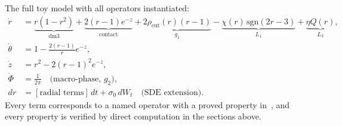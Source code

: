 \documentclass[12pt, oneside]{book}
\theoremstyle{plain}
\theoremstyle{definition}
\theoremstyle{remark}
\begin{document}
The full toy model with all operators instantiated:
\begin{align}
  \dot r &= \underbrace{r(1-r^2)}_{\text{dm3}}
           + \underbrace{2(r-1)e^{-z}}_{\text{contact}}
           + \underbrace{2\rho_{\mathrm{cut}}(r)(r-1)}_{g_1}
           - \underbrace{\chi(r)\,\mathrm{sgn}(2r-3)}_{L_1}
           + \underbrace{\eta Q(r)}_{L_3},\\
  \dot\theta &= 1 - \frac{2(r-1)}{r}e^{-z},\\
  \dot z &= r^2 - 2(r-1)^2 e^{-z},\\
  \dot\Phi &= \frac{1}{2\pi}\quad\text{(macro-phase, }g_2\text{)},\\
  dr &= [\text{radial terms}]\,dt + \sigma_0\,dW_t\quad
       \text{(SDE extension)}.
\end{align}
Every term corresponds to a named operator with a proved property
in~\cite{Paper1}, and every property is verified by direct computation
in the sections above.
\end{document}
